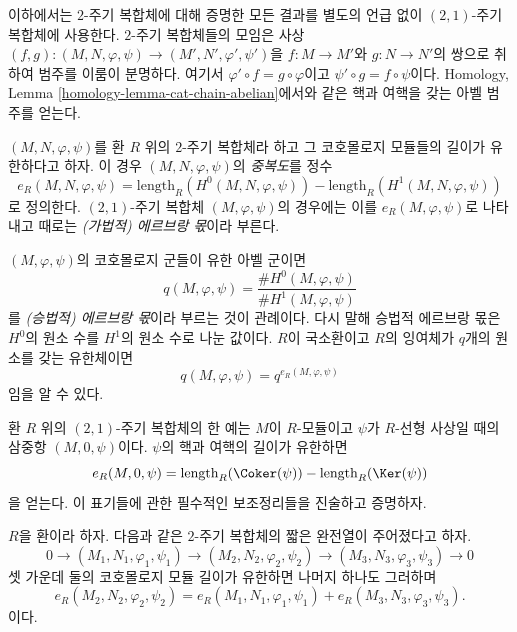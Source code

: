 \noindent
이하에서는 $2$-주기 복합체에 대해 증명한 모든 결과를 별도의 언급 없이
$(2, 1)$-주기 복합체에 사용한다. $2$-주기 복합체들의 모임은 사상
$(f, g) : (M, N, \varphi, \psi) \to (M', N', \varphi', \psi')$을
$f : M \to M'$와 $g : N \to N'$의 쌍으로 취하여 범주를 이룸이 분명하다.
여기서 $\varphi' \circ f = g \circ \varphi$이고
$\psi' \circ g = f \circ \psi$이다. Homology, Lemma
\ref{homology-lemma-cat-chain-abelian}에서와 같은 핵과 여핵을 갖는
아벨 범주를 얻는다.

\begin{definition}
\label{definition-periodic-length}
$(M, N, \varphi, \psi)$를 환 $R$ 위의 $2$-주기 복합체라 하고 그
코호몰로지 모듈들의 길이가 유한하다고 하자. 이 경우
$(M, N, \varphi, \psi)$의 {\it 중복도}를 정수
$$
e_R(M, N, \varphi, \psi) =
\text{length}_R(H^0(M, N, \varphi, \psi))
-
\text{length}_R(H^1(M, N, \varphi, \psi))
$$
로 정의한다. $(2, 1)$-주기 복합체 $(M, \varphi, \psi)$의 경우에는
이를 $e_R(M, \varphi, \psi)$로 나타내고 때로는
{\it (가법적) 에르브랑 몫}이라 부른다.
\end{definition}

\noindent
$(M, \varphi, \psi)$의 코호몰로지 군들이 유한 아벨 군이면
$$
q(M, \varphi, \psi) =
\frac{\# H^0(M, \varphi, \psi)}{\# H^1(M, \varphi, \psi)}
$$
를 {\it (승법적) 에르브랑 몫}이라 부르는 것이 관례이다. 다시 말해
승법적 에르브랑 몫은 $H^0$의 원소 수를 $H^1$의 원소 수로 나눈 값이다.
$R$이 국소환이고 $R$의 잉여체가 $q$개의 원소를 갖는 유한체이면
$$
q(M, \varphi, \psi) = q^{e_R(M, \varphi, \psi)}
$$
임을 알 수 있다.

\medskip\noindent
환 $R$ 위의 $(2, 1)$-주기 복합체의 한 예는 $M$이 $R$-모듈이고
$\psi$가 $R$-선형 사상일 때의 삼중항 $(M, 0, \psi)$이다. $\psi$의
핵과 여핵의 길이가 유한하면
\begin{equation}
\label{equation-multiplicity-coker-ker}
e_R(M, 0, \psi) = \text{length}_R(\Coker(\psi)) - \text{length}_R(\Ker(\psi))
\end{equation}
을 얻는다. 이 표기들에 관한 필수적인 보조정리들을 진술하고 증명하자.

\begin{lemma}
\label{lemma-additivity-periodic-length}
$R$을 환이라 하자. 다음과 같은 $2$-주기 복합체의 짧은 완전열이
주어졌다고 하자.
$$
0 \to (M_1, N_1, \varphi_1, \psi_1)
\to (M_2, N_2, \varphi_2, \psi_2)
\to (M_3, N_3, \varphi_3, \psi_3)
\to 0
$$
셋 가운데 둘의 코호몰로지 모듈 길이가 유한하면 나머지 하나도
그러하며
$$
e_R(M_2, N_2, \varphi_2, \psi_2) =
e_R(M_1, N_1, \varphi_1, \psi_1) +
e_R(M_3, N_3, \varphi_3, \psi_3).
$$
이다.
\end{lemma}

